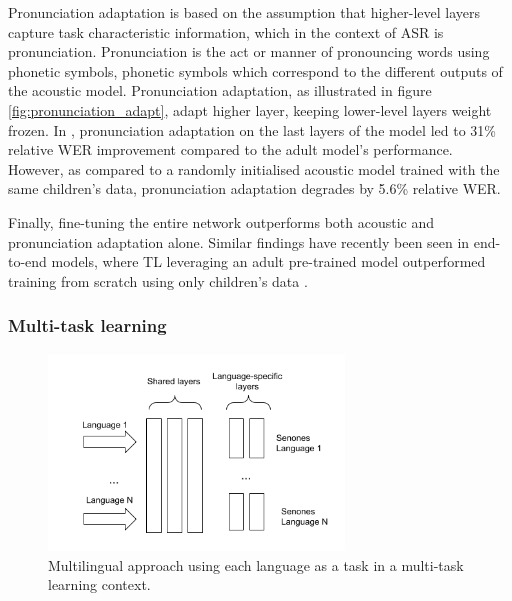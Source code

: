 Pronunciation adaptation is based on the assumption that higher-level layers capture task characteristic information, which in the context of ASR is pronunciation. Pronunciation is the act or manner of pronouncing words using phonetic symbols, phonetic symbols which correspond to the different outputs of the acoustic model. Pronunciation adaptation, as illustrated in figure \ref{fig:pronunciation_adapt}, adapt higher layer, keeping lower-level layers weight frozen. In \cite{TFchildren}, pronunciation adaptation on the last layers of the model led to 31\% relative WER improvement compared to the adult model's performance. However, as compared to a randomly initialised acoustic model trained with the same children's data, pronunciation adaptation degrades by 5.6\% relative WER.

Finally, fine-tuning the entire network outperforms both acoustic and pronunciation adaptation alone. Similar findings have recently been seen in end-to-end models, where TL leveraging an adult pre-trained model outperformed training from scratch using only children's data \cite{sri_end2end,gelin2021endtoend}. 
\subsubsection{Multi-task learning}%
\label{section:MTL}
\begin{figure}[t]
\begin{center}
\includegraphics[width=0.7\textwidth]{imgs/MTL.png}
\caption{Multilingual approach using each language as a task in a multi-task learning context.}
\label{fig:MTL}
\end{center}
\end{figure}

